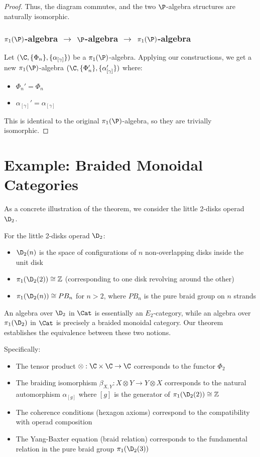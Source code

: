 \begin{proof}
Thus, the diagram commutes, and the two $\P$-algebra structures are naturally isomorphic.

\subsubsection{$\pi_1(\P)$-algebra $\to$ $\P$-algebra $\to$ $\pi_1(\P)$-algebra}

Let $(\C, \{\Phi_n\}, \{\alpha_{[\gamma]}\})$ be a $\pi_1(\P)$-algebra. Applying our constructions, we get a new $\pi_1(\P)$-algebra $(\C, \{\Phi_n'\}, \{\alpha_{[\gamma]}'\})$ where:

\begin{itemize}
    \item $\Phi_n' = \Phi_n$
    \item $\alpha_{[\gamma]}' = \alpha_{[\gamma]}$
\end{itemize}

This is identical to the original $\pi_1(\P)$-algebra, so they are trivially isomorphic.

\end{proof}

\section{Example: Braided Monoidal Categories}

As a concrete illustration of the theorem, we consider the little 2-disks operad $\D_2$.

\begin{eg}
For the little 2-disks operad $\D_2$:
\begin{itemize}
    \item $\D_2(n)$ is the space of configurations of $n$ non-overlapping disks inside the unit disk
    \item $\pi_1(\D_2(2)) \cong \mathbb{Z}$ (corresponding to one disk revolving around the other)
    \item $\pi_1(\D_2(n)) \cong PB_n$ for $n > 2$, where $PB_n$ is the pure braid group on $n$ strands
\end{itemize}

An algebra over $\D_2$ in $\Cat$ is essentially an $E_2$-category, while an algebra over $\pi_1(\D_2)$ in $\Cat$ is precisely a braided monoidal category. Our theorem establishes the equivalence between these two notions.

Specifically:
\begin{itemize}
    \item The tensor product $\otimes: \C \times \C \to \C$ corresponds to the functor $\Phi_2$
    \item The braiding isomorphism $\beta_{X,Y}: X \otimes Y \to Y \otimes X$ corresponds to the natural automorphism $\alpha_{[g]}$ where $[g]$ is the generator of $\pi_1(\D_2(2)) \cong \mathbb{Z}$
    \item The coherence conditions (hexagon axioms) correspond to the compatibility with operad composition
    \item The Yang-Baxter equation (braid relation) corresponds to the fundamental relation in the pure braid group $\pi_1(\D_2(3))$
\end{itemize}
\end{eg}

